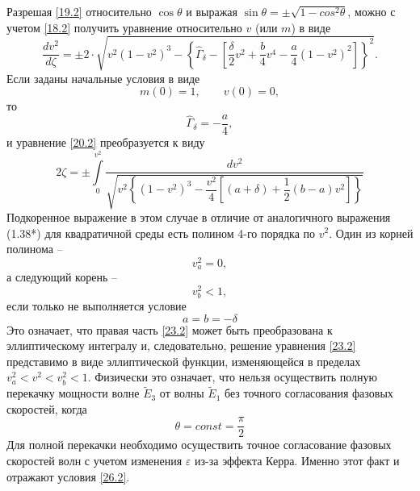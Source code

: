 \documentclass[a4paper]{article}
\begin{document}
	Разрешая \eqref{19.2} относительно $\cos\theta$ и выражая $\sin\theta=\pm\sqrt{1-cos^{2}\theta}$, можно с учетом \eqref{18.2} получить уравнение относительно  $v$ (или $m$) в виде 
	\begin{equation}
		\frac{dv^{2}}{d\zeta}=\pm2\cdot\sqrt{v^{2}(1-v^{2})^{3}-\left\{\hat{\Gamma}_{\delta}-\left[\frac{\delta}{2}v^{2}+\frac{b}{4}v^{4}-\frac{a}{4}(1-v^{2})^{2}\right]\right\}^{2}}.
		\label{20.2}
	\end{equation}
	Если заданы начальные условия в виде
	\begin{equation}
		m(0)=1,\qquad v(0)=0,\label{21.2}
	\end{equation}
	то
	\begin{equation}
		\hat{\Gamma}_{\delta}=-\frac{a}{4},\label{22.2}
	\end{equation}
	и уравнение \eqref{20.2} преобразуется к виду 
	\begin{equation}
		2\zeta=\pm\int\limits_{0}^{v^{2}}\dfrac{dv^{2}}{\sqrt{v^{2}\left\{(1-v^{2})^{3}-\dfrac{v^{2}}{4}\left[(a+\delta)+\dfrac{1}{2}(b-a)v^{2}\right]\right\}}}
		\label{23.2}
	\end{equation}
	Подкоренное выражение в этом случае в отличие от аналогичного выражения (1.38*) для квадратичной среды есть полином  4-го  порядка по $v^{2}$. Один из корней полинома -- 
	\begin{equation}
		v^{2}_{a}=0,\label{24.2}
	\end{equation}
	а следующий корень -- 
	\begin{equation}
		v^{2}_{b}<1,\label{25.2}
	\end{equation}
	если только не выполняется условие
	\begin{equation}
		a=b=-\delta
		\label{26.2}
	\end{equation}
	Это означает, что правая часть \eqref{23.2} может быть преобразована к  эллиптическому интегралу и, следовательно, решение уравнения \eqref{23.2} представимо в виде эллиптической функции, изменяющейся в пределах $v^{2}_{a}<v^{2}<v^{2}_{b}<1$. Физически это означает, что нельзя осуществить полную перекачку мощности волне $\tilde{E}_{3}$  от волны $\tilde{E}_{1}$  без точного согласования фазовых скоростей, когда
	\begin{equation}
		\theta=const=\frac{\pi}{2}\label{27.2}
	\end{equation}
	Для полной перекачки необходимо осуществить точное согласование фазовых скоростей волн с учетом изменения $\varepsilon$ из-за эффекта Керра. Именно этот факт и отражают условия \eqref{26.2}.
	
\end{document}
